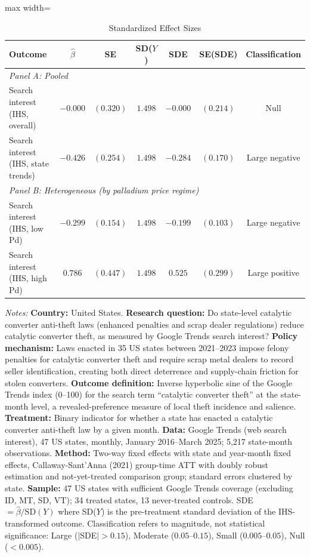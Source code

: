 \begin{table}[htbp]
\centering
\caption{Standardized Effect Sizes}
\label{tab:sde}
\begin{adjustbox}{max width=\textwidth}
\begin{tabular}{lcccccc}
\hline\hline
Outcome & $\hat{\beta}$ & SE & SD($Y$) & SDE & SE(SDE) & Classification \\
\hline
\multicolumn{7}{l}{\textit{Panel A: Pooled}} \\
Search interest (IHS, overall) & $-0.000$ & $(0.320)$ & $1.498$ & $-0.000$ & $(0.214)$ & Null \\
Search interest (IHS, state trends) & $-0.426$ & $(0.254)$ & $1.498$ & $-0.284$ & $(0.170)$ & Large negative \\
[0.5em]
\multicolumn{7}{l}{\textit{Panel B: Heterogeneous (by palladium price regime)}} \\
Search interest (IHS, low Pd) & $-0.299$ & $(0.154)$ & $1.498$ & $-0.199$ & $(0.103)$ & Large negative \\
Search interest (IHS, high Pd) & $0.786$ & $(0.447)$ & $1.498$ & $0.525$ & $(0.299)$ & Large positive \\
\hline\hline
\end{tabular}
\end{adjustbox}
\begin{tablenotes}[flushleft]
\small
\item \textit{Notes:} \textbf{Country:} United States. \textbf{Research question:} Do state-level catalytic converter anti-theft laws (enhanced penalties and scrap dealer regulations) reduce catalytic converter theft, as measured by Google Trends search interest? \textbf{Policy mechanism:} Laws enacted in 35 US states between 2021--2023 impose felony penalties for catalytic converter theft and require scrap metal dealers to record seller identification, creating both direct deterrence and supply-chain friction for stolen converters. \textbf{Outcome definition:} Inverse hyperbolic sine of the Google Trends index (0--100) for the search term ``catalytic converter theft'' at the state-month level, a revealed-preference measure of local theft incidence and salience. \textbf{Treatment:} Binary indicator for whether a state has enacted a catalytic converter anti-theft law by a given month. \textbf{Data:} Google Trends (web search interest), 47 US states, monthly, January 2016--March 2025; 5,217 state-month observations. \textbf{Method:} Two-way fixed effects with state and year-month fixed effects, Callaway-Sant'Anna (2021) group-time ATT with doubly robust estimation and not-yet-treated comparison group; standard errors clustered by state. \textbf{Sample:} 47 US states with sufficient Google Trends coverage (excluding ID, MT, SD, VT); 34 treated states, 13 never-treated controls. SDE $= \hat{\beta} / \text{SD}(Y)$ where SD($Y$) is the pre-treatment standard deviation of the IHS-transformed outcome. Classification refers to magnitude, not statistical significance: Large ($|$SDE$| > 0.15$), Moderate ($0.05$--$0.15$), Small ($0.005$--$0.05$), Null ($< 0.005$).
\end{tablenotes}
\end{table}

